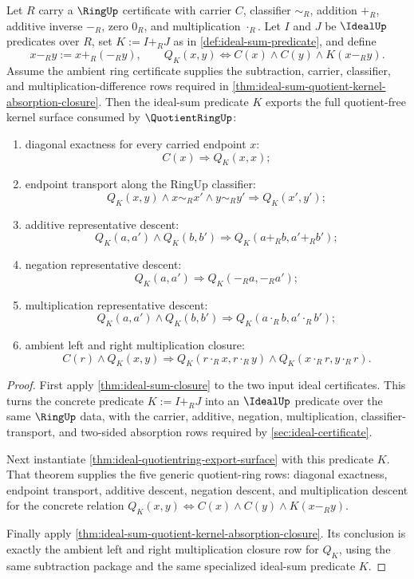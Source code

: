 \begin{theorem}
\label{thm:ideal-sum-quotientring-export-surface}
Let $R$ carry a $\RingUp$ certificate with carrier $C$, classifier $\sim_R$, addition $+_R$, additive inverse $-_R$, zero $0_R$, and multiplication $\cdot_R$. Let $I$ and $J$ be $\IdealUp$ predicates over $R$, set $K:=I+_RJ$ as in \autoref{def:ideal-sum-predicate}, and define
$$
x-_R y:=x+_R(-_R y),
\qquad
Q_K(x,y)\Longleftrightarrow C(x)\land C(y)\land K(x-_R y).
$$
Assume the ambient ring certificate supplies the subtraction, carrier, classifier, and multiplication-difference rows required in \autoref{thm:ideal-sum-quotient-kernel-absorption-closure}. Then the ideal-sum predicate $K$ exports the full quotient-free kernel surface consumed by $\QuotientRingUp$:
\begin{enumerate}
\item diagonal exactness for every carried endpoint $x$:
$$
C(x)\Longrightarrow Q_K(x,x);
$$
\item endpoint transport along the RingUp classifier:
$$
Q_K(x,y)\land x\sim_Rx'\land y\sim_Ry'\Longrightarrow Q_K(x',y');
$$
\item additive representative descent:
$$
Q_K(a,a')\land Q_K(b,b')\Longrightarrow Q_K(a+_Rb,a'+_Rb');
$$
\item negation representative descent:
$$
Q_K(a,a')\Longrightarrow Q_K(-_Ra,-_Ra');
$$
\item multiplication representative descent:
$$
Q_K(a,a')\land Q_K(b,b')\Longrightarrow Q_K(a\cdot_Rb,a'\cdot_Rb');
$$
\item ambient left and right multiplication closure:
$$
C(r)\land Q_K(x,y)\Longrightarrow Q_K(r\cdot_Rx,r\cdot_Ry)\land Q_K(x\cdot_Rr,y\cdot_Rr).
$$
\end{enumerate}
\end{theorem}
\begin{proof}
First apply \autoref{thm:ideal-sum-closure} to the two input ideal certificates. This turns the concrete predicate $K:=I+_RJ$ into an $\IdealUp$ predicate over the same $\RingUp$ data, with the carrier, additive, negation, multiplication, classifier-transport, and two-sided absorption rows required by \autoref{sec:ideal-certificate}.

Next instantiate \autoref{thm:ideal-quotientring-export-surface} with this predicate $K$. That theorem supplies the five generic quotient-ring rows: diagonal exactness, endpoint transport, additive descent, negation descent, and multiplication descent for the concrete relation $Q_K(x,y)\Longleftrightarrow C(x)\land C(y)\land K(x-_R y)$.

Finally apply \autoref{thm:ideal-sum-quotient-kernel-absorption-closure}. Its conclusion is exactly the ambient left and right multiplication closure row for $Q_K$, using the same subtraction package and the same specialized ideal-sum predicate $K$.
\end{proof}

